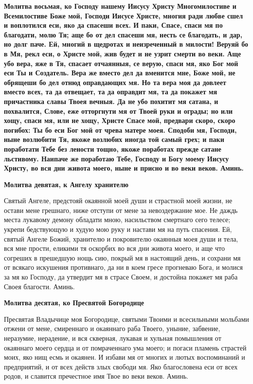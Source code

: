 \medskip
\bfseries Молитва восьмая, ко Господу нашему Иисусу Христу\normalfont{}\nopagebreak
Многомилостиве и Всемилостиве Боже мой, Господи Иисусе Христе, многия ради любве сшел и воплотился еси, яко да спасеши всех. И паки, Спасе, спаси мя по благодати, молю Тя; аще бо от дел спасеши мя, несть се благодать, и дар, но долг паче. Ей, многий в щедротах и неизреченный в милости! Веруяй бо в Мя, рекл еси, о Христе мой, жив будет и не узрит смерти во веки. Аще убо вера, яже в Тя, спасает отчаянныя, се верую, спаси мя, яко Бог мой еси Ты и Создатель. Вера же вместо дел да вменится мне, Боже мой, не обрящеши бо дел отнюд оправдающих мя. Но та вера моя да довлеет вместо всех, та да отвещает, та да оправдит мя, та да покажет мя причастника славы Твоея вечныя. Да не убо похитит мя сатана, и похвалится, Слове, еже отторгнути мя от Твоей руки и ограды; но или хощу, спаси мя, или не хощу, Христе Спасе мой, предвари скоро, скоро погибох: Ты бо еси Бог мой от чрева матере моея. Сподоби мя, Господи, ныне возлюбити Тя, якоже возлюбих иногда той самый грех; и паки поработати Тебе без лености тощно, якоже поработах прежде сатане льстивому. Наипаче же поработаю Тебе, Господу и Богу моему Иисусу Христу, во вся дни живота моего, ныне и присно и во веки веков. Аминь. 


\medskip
\bfseries Молитва девятая, к Ангелу хранителю\normalfont{}\nopagebreak


Святый Ангеле, предстояй окаянной моей души и страстной моей жизни, не остави мене грешнаго, ниже отступи от мене за невоздержание мое. Не даждь места лукавому демону обладати мною, насильством смертнаго сего телесе; укрепи бедствующую и худую мою руку и настави мя на путь спасения. Ей, святый Ангеле Божий, хранителю и покровителю окаянныя моея души и тела, вся мне прости, еликими тя оскорбих во вся дни живота моего, и аще что согреших в прешедшую нощь сию, покрый мя в настоящий день, и сохрани мя от всякаго искушения противнаго, да ни в коем гресе прогневаю Бога, и молися за мя ко Господу, да утвердит мя в страсе Своем, и достойна покажет мя раба Своея благости. Аминь. 


\medskip
\bfseries Молитва десятая, ко Пресвятой Богородице\normalfont{}\nopagebreak


Пресвятая Владычице моя Богородице, святыми Твоими и всесильными мольбами отжени от мене, смиреннаго и окаяннаго раба Твоего, уныние, забвение, неразумие, нерадение, и вся скверная, лукавая и хульная помышления от окаяннаго моего сердца и от помраченнаго ума моего; и погаси пламень страстей моих, яко нищ есмь и окаянен. И избави мя от многих и лютых воспоминаний и предприятий, и от всех действ злых свободи мя. Яко благословена еси от всех родов, и славится пречестное имя Твое во веки веков. Аминь. 


